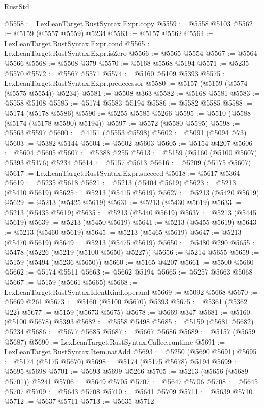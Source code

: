 \begin{lexlean}{RustStd}
\begin{coremodule}
@5558 := LexLeanTarget.RustSyntax.Expr.copy
@5559 := @5558 @5103
@5562 := @5159 (@5557 @5559) @5234
@5563 := @5157 @5562
@5564 := LexLeanTarget.RustSyntax.Expr.cond
@5565 := LexLeanTarget.RustSyntax.Expr.isZero
@5566 := @5565 @5554
@5567 := @5564 @5566
@5568 := @5508 @379
@5570 := @5168 @5568 @5194
@5571 := @5235 @5570
@5572 := @5567 @5571
@5574 := @5160 @5109 @5393
@5575 := LexLeanTarget.RustSyntax.Expr.predecessor
@5580 := @5157 (@5159 (@5574 (@5575 @5554)) @5234)
@5581 := @5508 @363
@5582 := @5168 @5581
@5583 := @5558 @5108
@5585 := @5174 @5583 @5194
@5586 := @5582 @5585
@5588 := @5174 (@5178 @5586)
@5590 := @5255 @5585 @5266
@5595 := @5510 (@5588 (@5174 (@5178 @5590) @5194))
@5597 := @5572 (@5580 @5595)
@5598 := @5563 @5597
@5600 := @4151 (@5553 @5598)
@5602 := @5091 (@5094 @73)
@5603 := @5382 @5144
@5604 := @5602 @5603
@5605 := @5154 @4207
@5606 := @5604 @5605
@5607 := @5388 @255
@5613 := @5159 (@5160 (@5100 @5607) @5393 @5176) @5234
@5614 := @5157 @5613
@5616 := @5209 (@5175 @5607)
@5617 := LexLeanTarget.RustSyntax.Expr.succeed
@5618 := @5617 @5364
@5619 := @5235 @5618
@5621 := @5213 (@5404 @5619)
@5623 := @5213 (@5410 @5619)
@5625 := @5213 (@5415 @5619)
@5627 := @5213 (@5420 @5619)
@5629 := @5213 (@5425 @5619)
@5631 := @5213 (@5430 @5619)
@5633 := @5213 (@5435 @5619)
@5635 := @5213 (@5440 @5619)
@5637 := @5213 (@5445 @5619)
@5639 := @5213 (@5450 @5619)
@5641 := @5213 (@5455 @5619)
@5643 := @5213 (@5460 @5619)
@5645 := @5213 (@5465 @5619)
@5647 := @5213 (@5470 @5619)
@5649 := @5213 (@5475 @5619)
@5650 := @5480 @290
@5655 := @5478 (@5226 (@5219 (@5100 @5650) @5227))
@5656 := @5214 @5655
@5659 := @5159 (@5494 (@5236 @5650))
@5660 := @5165 @4207
@5661 := @5500 @5660
@5662 := @5174 @5511
@5663 := @5662 @5194
@5665 := @5257 @5663 @5068
@5667 := @5159 (@5661 @5665)
@5668 := LexLeanTarget.RustSyntax.IdentKind.operand
@5669 := @5092 @5668
@5670 := @5669 @261
@5673 := @5160 (@5100 @5670) @5393
@5675 := @5361 (@5362 @22)
@5677 := @5159 (@5673 @5675)
@5678 := @5669 @347
@5681 := @5160 (@5100 @5678) @5393
@5682 := @5558 @5498
@5685 := @5159 (@5681 @5682) @5234
@5686 := @5677 @5685
@5687 := @5667 @5686
@5689 := @5157 (@5659 @5687)
@5690 := LexLeanTarget.RustSyntax.Callee.runtime
@5691 := LexLeanTarget.RustSyntax.Item.natAdd
@5693 := @5250 (@5690 @5691)
@5695 := @5174 (@5175 @5670)
@5698 := @5174 (@5175 @5678) @5194
@5699 := @5695 @5698
@5701 := @5693 @5699 @5266
@5705 := @5213 (@5656 (@5689 @5701)) @5241
@5706 := @5649 @5705
@5707 := @5647 @5706
@5708 := @5645 @5707
@5709 := @5643 @5708
@5710 := @5641 @5709
@5711 := @5639 @5710
@5712 := @5637 @5711
@5713 := @5635 @5712

\end{coremodule}
\end{lexlean}
